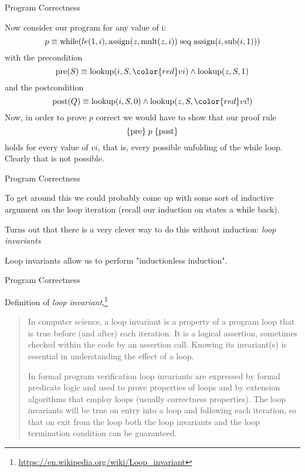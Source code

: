 \documentclass{beamer}
\begin{document}
\begin{frame}[fragile]{Program Correctness}

\small

Now consider our program for any value of i:
\[
p \equiv {\rm while}(le(1,i), {\rm assign}(z,{\rm mult}(z,i)) \; {\rm seq}\; {\rm assign}(i,{\rm sub}(i,1)))
\]
with the precondition
\[
{\rm pre}(S) \equiv {\rm lookup}(i,S,{\color{red}vi}) \wedge {\rm lookup}(z,S,1)
\]
and the postcondition
\[
{\rm post}(Q) \equiv {\rm lookup}(i,S,0) \wedge {\rm lookup}(z,S,{\color{red}vi!})
\]
Now, in order to prove $p$ correct we would have to show that our proof rule
\[
\{{\rm pre}\}\; p \; \{{\rm post}\}
\]
holds for every value of $vi$, that is, every possible unfolding of the while loop.
Clearly that is not possible.
\end{frame}

\begin{frame}[fragile]{Program Correctness}

To get around this we could probably come up  with some sort of inductive argument
on the loop iteration (recall our induction on states a while back).

\vspace{.1in}

Turns out that there is a very clever way to do this without induction:  {\em loop invariants}

\vspace{.1in}

Loop invariants allow us to perform "inductionless induction".
\end{frame}

\begin{frame}[fragile]{Program Correctness}

Definition of {\em loop invariant},\footnote{\url{https://en.wikipedia.org/wiki/Loop_invariant}}

\begin{quote}
In computer science, a loop invariant is a property of a program loop that is true before (and after) each iteration. It is a logical assertion, sometimes checked within the code by an assertion call. Knowing its invariant(s) is essential in understanding the effect of a loop.

\vspace{.2in}

In formal program verification loop invariants are expressed by formal predicate logic and used to prove properties of loops and by extension algorithms that employ loops (usually correctness properties). The loop invariants will be true on entry into a loop and following each iteration, so that on exit from the loop both the loop invariants and the loop termination condition can be guaranteed.
\end{quote}

\end{frame}
\end{document}
